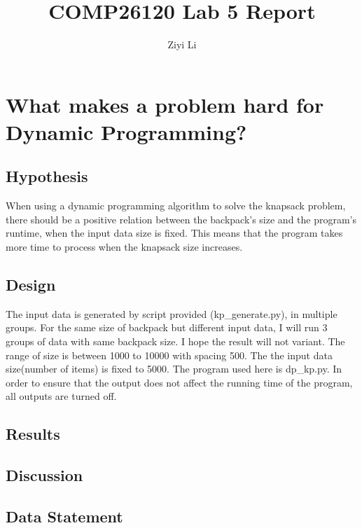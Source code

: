 \documentclass[a4]{article}
\title{COMP26120 Lab 5 Report}
\author{Ziyi Li}
\begin{document}
\maketitle


\section{What makes a problem hard for Dynamic Programming?}

\subsection{Hypothesis}

When using a dynamic programming algorithm to solve the knapsack problem, there should be a positive relation between the backpack's size and the program's runtime, when the input data size is fixed. This means that the program takes more time to process when the knapsack size increases.

\subsection{Design}

The input data is generated by script provided (kp\_generate.py), in multiple groups. For the same size of backpack but different input data, I will run 3 groups of data with same backpack size. I hope the result will not variant. The range of size is between 1000 to 10000 with spacing 500. The the input data size(number of items) is fixed to 5000. The program used here is dp\_kp.py. In order to ensure that the output does not affect the running time of the program, all outputs are turned off.

\subsection{Results}
\subsection{Discussion}
\subsection{Data Statement}


\appendix

\end{document}
